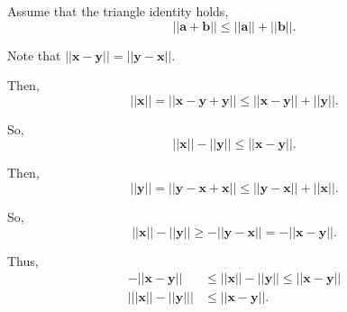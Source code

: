 \documentclass[../hw9]{subfiles}
\begin{document}
Assume that the triangle identity holds, \[||\mathbf{a}+\mathbf{b}||\leq||\mathbf{a}||+||\mathbf{b}||.\]

Note that $||\mathbf{x}-\mathbf{y}||=||\mathbf{y}-\mathbf{x}||$.

Then, \[||\mathbf{x}||=||\mathbf{x}-\mathbf{y}+\mathbf{y}||\leq||\mathbf{x}-\mathbf{y}||+||\mathbf{y}||.\]

So, \[||\mathbf{x}||-||\mathbf{y}||\leq||\mathbf{x}-\mathbf{y}||.\]

Then, \[||\mathbf{y}||=||\mathbf{y}-\mathbf{x}+\mathbf{x}||\leq||\mathbf{y}-\mathbf{x}||+||\mathbf{x}||.\]

So, \[||\mathbf{x}||-||\mathbf{y}||\geq-||\mathbf{y}-\mathbf{x}||=-||\mathbf{x}-\mathbf{y}||.\]

Thus,
\begin{align*}
    -||\mathbf{x}-\mathbf{y}||&\leq||\mathbf{x}||-||\mathbf{y}||\leq||\mathbf{x}-\mathbf{y}|| \\
    \Big| ||\mathbf{x}||-||\mathbf{y}|| \Big| &\leq ||\mathbf{x}-\mathbf{y}||.\\
\end{align*}
\end{document}
